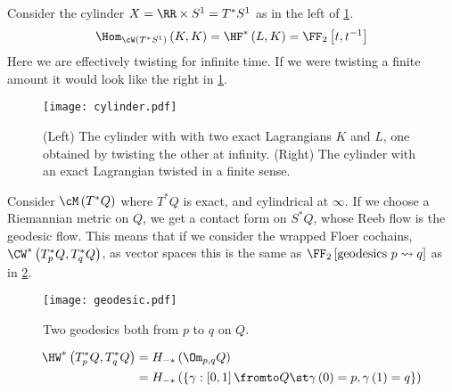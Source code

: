 \documentclass{amsart}
\begin{document}
\begin{exm}
Consider the cylinder $X = \RR\times S^1 = T^* S^1$ as in the left of
\cref{fig:cylinder}.
\begin{equation}
\Hom_{\cW\left( T^* S^1 \right)} \left( K , K \right) = 
\HF^*\left( L , K \right) = \FF_2\left[ t , t^{-1} \right]
\end{equation}
Here we are effectively twisting for infinite time. 
If we were twisting a finite amount it would look like the right in \cref{fig:cylinder}.
\begin{figure}
\centering
\texttt{[image: cylinder.pdf]}
\caption{(Left) The cylinder with with two exact Lagrangians
$K$ and $L$, one obtained by twisting the other at infinity.
(Right) The cylinder with an exact Lagrangian twisted
in a finite sense.}
\label{fig:cylinder}
\end{figure}
\end{exm}

Consider $\cM\left( T^* Q \right)$
where $T^* Q$ is exact, and cylindrical at $\infty$. 
If we choose a Riemannian metric on $Q$, we get a contact
form on $S^* Q$, whose Reeb flow is the geodesic flow.
This means that if we consider the wrapped Floer cochains, 
$\CW^*\left( T_p^* Q , T_q^* Q \right)$, as vector spaces this is the same as
$\FF_2\left[ \text{geodesics }p\leadsto q \right]$ as in \cref{fig:geodesic}.
\begin{figure}
\texttt{[image: geodesic.pdf]}
\caption{Two geodesics both from $p$ to $q$ on $Q$.}
\label{fig:geodesic}
\end{figure}

\begin{thm}
\begin{align}
\HW^*\left( T^*_p Q , T_q^* Q \right) &= H_{-*}\left( \Om_{p,q} Q \right) 
\\&=H_{-*}\left( \left\{ \gamma:\left[ 0,1 \right] \fromto Q \st \gamma\left( 0 \right) = p, 
\gamma\left( 1 \right) = q\right\} \right)
\end{align}
\end{thm}
\end{document}

